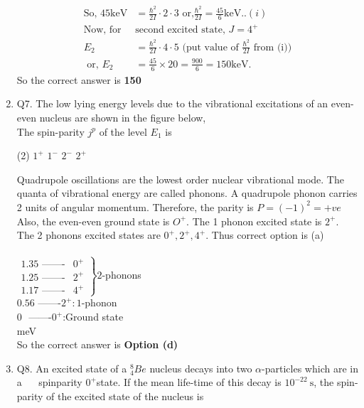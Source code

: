 \begin{enumerate}
\begin{answer}
\begin{align*}
		\text{So, }45 \mathrm{keV}&=\frac{\hbar^2}{2 I} \cdot 2 \cdot 3\text{ or,} \frac{\hbar^2}{2 I}=\frac{45}{6} \mathrm{keV}..(i)\\
		\text{Now, for }&\text{second excited state, }J=4^{+}\\
		E_2&=\frac{\hbar^2}{2 I} \cdot 4 \cdot 5\text{ (put value of $\frac{\hbar^2}{2 I}$ from (i))}\\
		\text{	or, }E_2&=\frac{45}{6} \times 20=\frac{900}{6}=150 \mathrm{keV}.
		\end{align*}
		So the correct answer is \textbf{150}
	\end{answer}
	\item Q7. The low lying energy levels due to the vibrational excitations of an even-even nucleus are shown in the figure below,\\
	The spin-parity $j^p$ of the level $E_1$ is
	{}
	\begin{tasks}(2)
		\task[\textbf{a.}]$1^{+}$
		\task[\textbf{b.}]$1^{-}$
		\task[\textbf{c.}]$2^{-}$
		\task[\textbf{d.}]$2^{+}$ 
	\end{tasks}
	\begin{answer}
		Quadrupole oscillations are the lowest order nuclear vibrational mode. The quanta of vibrational energy are called phonons. A quadrupole phonon carries 2 units of angular momentum. Therefore, the parity is $P=(-1)^2=+v e$\\
		Also, the even-even ground state is $O^{+}$. The 1 phonon excited state is $2^{+}$. The 2 phonons excited states are $0^{+}, 2^{+}, 4^{+}$. Thus correct option is (a)\\\\
		$\left.\begin{array}{ll}1.35\text{ -------}& 0^{+} \\ 1.25 \text{ -------}& 2^{+} \\ 1.17 \text{ -------}& 4^{+}\end{array}\right\} 2$-phonons\\
		$0.56\text{ -------}2^{+}: 1$-phonon\\
		0 $\text{ -------}0^{+}$:Ground state\\
		meV\\
		So the correct answer is \textbf{Option (d)}
	\end{answer}
	\item Q8. An excited state of a ${ }_4^8 B e$ nucleus decays into two $\alpha$-particles which are in a $\quad$ spinparity $0^{+}$state. If the mean life-time of this decay is $10^{-22} \mathrm{~s}$, the spin-parity of the excited state of the nucleus is

\end{enumerate}
